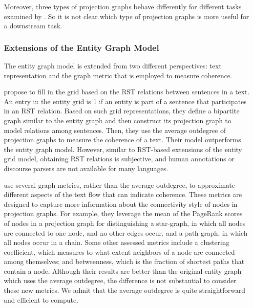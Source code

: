 Moreover, three types of projection graphs behave differently for different tasks examined by . 
So it is not clear which type of projection graphs is more useful for a downstream task. 

\subsubsection{Extensions of the Entity Graph Model}

The entity graph model is extended from two different perspectives: text representation and the graph metric that is employed to measure coherence. 

 propose to fill in the grid based on the RST relations between sentences in a text. 
An entry in the entity grid is 1 if an entity is part of a sentence that participates in an RST relation.
Based on such grid representations, they define a bipartite graph similar to the entity graph and then construct its projection graph to model relations among sentences. 
Then, they use the average outdegree of projection graphs to measure the coherence of a text. 
Their model outperforms the entity graph model. 
However, similar to RST-based extensions of the entity grid model, obtaining RST relations is subjective, and human annotations or discourse parsers are not available for many languages. 

 use several graph metrics, rather than the average outdegree, to approximate different aspects of the text flow that can indicate coherence.  
These metrics are designed to capture more information about the connectivity style of nodes in projection graphs. 
For example, they leverage the mean of the PageRank scores \cite{newmanmark10} of nodes in a projection graph for distinguishing a star-graph, in which all nodes are connected to one node, and no other edges occur, and a path graph, in which all nodes occur in a chain. 
Some other assessed metrics include a clustering coefficient, which measures to what extent neighbors of a node are connected among themselves; and betweenness, which is the fraction of shortest paths that contain a node. 
Although their results are better than the original entity graph which uses the average outdegree, the difference is not substantial to consider these new metrics. 
We admit that the average outdegree is quite straightforward and efficient to compute. 

